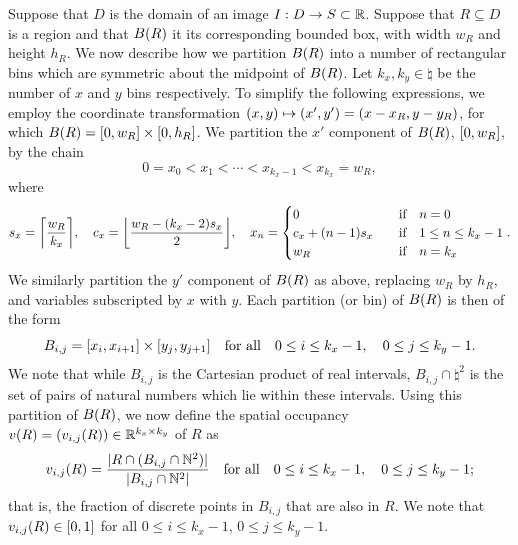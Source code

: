 \documentclass{article}
\begin{document}
Suppose that $D$ is the domain of an image $I : D \to S \subset \mathbb{R}$.
Suppose that $R \subseteq D$ is a region and that $B(R)$ it its corresponding
bounded box, with width $w_{R}$ and height $h_{R}$.
We now describe how we partition $B(R)$ into a number of rectangular bins
which are symmetric about the midpoint of $B(R)$.
Let $k_{x}, k_{y} \in \natural$ be the number of $x$ and $y$ bins respectively.
To simplify the following expressions, we employ the coordinate transformation
$(x, y) \mapsto (x', y') = (x - x_{R}, y - y_{R})$, for which
$B(R) = [0, w_{R}] \times [0, h_{R}]$.
We partition the $x'$ component of $B(R)$, $[0, w_{R}]$, by the chain
\begin{equation}
  \label{eq:def-bins-chain-x}
  0
  =
  x_{0}
  <
  x_{1}
  <
  \dotsb
  <
  x_{k_{x} - 1}
  <
  x_{k_{x}}
  =
  w_{R}
  ,
\end{equation}
where
\begin{equation}
  \label{eq:def-bins-x}
  s_{x}
  =
  \lrceil[\bigg]
  {
    \frac
    {
      w_{R}
    }
    {
      k_{x}
    }
  }
  ,
  \quad
  c_{x}
  =
  \lrfloor[\bigg]
  {
    \frac
    {
      w_{R}
      -
      \lr{k_{x} - 2}
      s_{x}
    }
    {
      2
    }
  }
  ,
  \quad
  x_{n}
  =
  \begin{cases}
    0
    &
    \qq{if}
    n = 0
    \\
    c_{x}
    +
    \lr{n - 1}
    s_{x}
    &
    \qq{if}
    1 \leq n \leq k_{x} - 1
    \\
    w_{R}
    &
    \qq{if}
    n = k_{x}
  \end{cases}
  .
\end{equation}
We similarly partition the $y'$ component of $B(R)$ as above, replacing
$w_{R}$ by $h_{R}$, and variables subscripted by $x$ with $y$.
Each partition (or bin) of $B(R)$ is then of the form
\begin{equation}
  \label{eq:def-bins}
  B_{i, j}
  =
  \lrsq{x_{i}, x_{i + 1}}
  \times
  \lrsq{y_{j}, y_{j + 1}}
  \qq{for all}
  0 \leq i \leq k_{x} - 1
  ,
  \quad
  0 \leq j \leq k_{y} - 1
  .
\end{equation}
We note that while $B_{i, j}$ is the Cartesian product of real intervals,
$B_{i, j} \cap \natural^{2}$ is the set of pairs of natural numbers which lie
within these intervals.
Using this partition of $B(R)$, we now define the spatial occupancy
$v(R) = (v_{i, j}(R)) \in \mathbb{R}^{k_{x} \times k_{y}}$ of $R$ as
\begin{equation}
  \label{eq:def-spatial-occupancy}
  v_{i, j}\lr{R}
  =
  \frac
  {
    \lrabs
    {
      R
      \cap
      \lr
      {
        B_{i, j}
        \cap
        \natural^{2}
      }
    }
  }
  {
    \lrabs
    {
      B_{i, j}
      \cap
      \natural^{2}
    }
  }
  \qq{for all}
  0 \leq i \leq k_{x} - 1
  ,
  \quad
  0 \leq j \leq k_{y} - 1
  ;
\end{equation}
that is, the fraction of discrete points in $B_{i, j}$ that are also in $R$.
We note that $v_{i, j}(R) \in [0, 1]$ for all $0 \leq i \leq k_{x} - 1$,
$0 \leq j \leq k_{y} - 1$.
\end{document}
